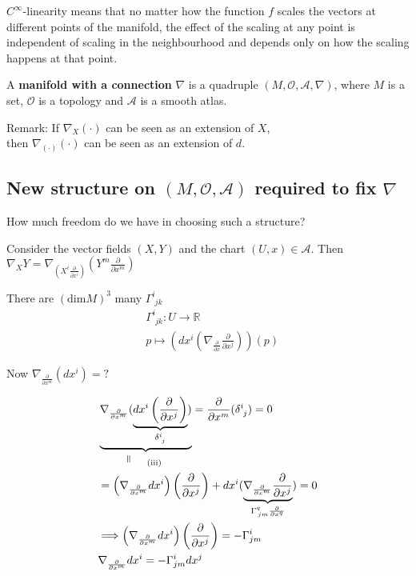 $C^{\infty}$-linearity means that no matter how the function $f$ scales the vectors at different points of the manifold, the effect of the scaling at any point is independent of scaling in the neighbourhood and depends only on how the scaling happens at that point.

A \textbf{manifold with a connection} $\nabla$ is a quadruple $(M, \mathcal{O}, \mathcal{A}, \nabla)$, where $M$ is a set, $\mathcal{O}$ is a topology and $\mathcal{A}$ is a smooth atlas.

Remark: If $\nabla_X (\cdot)$ can be seen as an extension of $X$, \\
then $\nabla_{(\cdot)}(\cdot)$ can be seen as an extension of $d$.

\subsection{New structure on $(M,\mathcal{O},\mathcal{A})$ required to fix $\nabla$}
How much freedom do we have in choosing such a structure?

Consider the vector fields $(X,Y)$ and the chart $(U,x) \in \mathcal{A}$. Then \\
$\nabla_X Y = \nabla_{\left(X^i \frac{\partial}{\partial x^i}\right)} \left(Y^m \frac{\partial}{\partial x^m}\right)$

There are $(\text{dim}M)^3$ many $\Gamma^i_{ \, \, j k}$
\[
\begin{aligned}
&  \Gamma^i_{ \, \, jk} : U \to \mathbb{R} \\ 
&  p \mapsto \left( dx^i ( \nabla_{ \frac{ \partial}{ \partial x} } \frac{ \partial }{ \partial x^j } ) \right)(p)
\end{aligned}
\]

Now $\nabla_{ \frac{ \partial }{ \partial x^m}  }(dx^i) = ?$

\[
\begin{aligned}
  & \underbrace{ \nabla_{  \frac{ \partial }{ \partial x^m} } ( \underbrace{ dx^i \left( \frac{ \partial }{ \partial x^j } \right) }_{ \delta^i_{ \, \, j} } ) }_{ \rotatebox{90}{$\,=$} \quad \, \text{ (iii) } }  = \frac{ \partial }{ \partial x^m} ( \delta^i_{ \, \, j} ) = 0  \\
& = \left( \nabla_{ \frac{ \partial }{ \partial x^m} } dx^i \right)\left( \frac{ \partial }{ \partial x^j} \right) + dx^i (   \underbrace{ \nabla_{ \frac{ \partial }{ \partial x^m } } \frac{ \partial }{ \partial x^j } }_{ \Gamma^q_{ \, jm }\frac{ \partial }{ \partial x^q} }   ) = 0 \\
& \Longrightarrow \left( \nabla_{ \frac{ \partial }{ \partial x^m } } dx^i \right)\left( \frac{ \partial }{ \partial x^j } \right) = - \Gamma^i_{ jm} \\
& \nabla_{ \frac{ \partial }{ \partial x^m} } dx^i = -\Gamma^i_{ jm} dx^j 
\end{aligned}
\]


